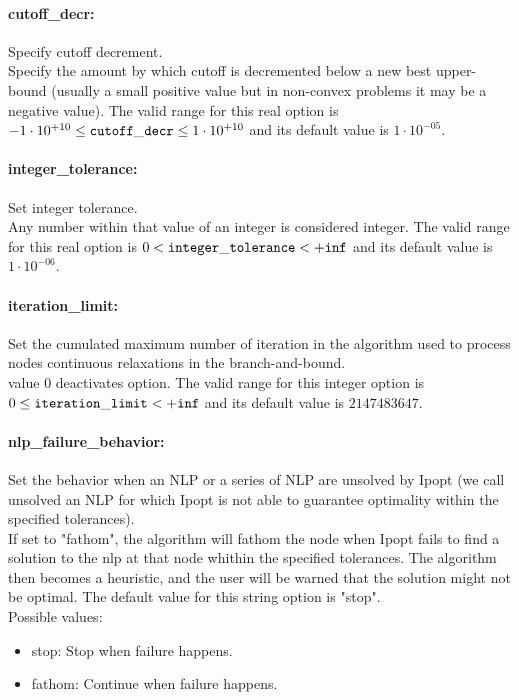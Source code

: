 \paragraph{cutoff\_decr:}\label{sec:cutoff_decr} Specify cutoff decrement. $\;$ \\
 Specify the amount by which cutoff is decremented
below a new best upper-bound (usually a small
positive value but in non-convex problems it may
be a negative value). The valid range for this real option is 
$-1 \cdot 10^{+10} \le {\tt cutoff\_decr } \le 1 \cdot 10^{+10}$
and its default value is $1 \cdot 10^{-05}$.


\paragraph{integer\_tolerance:}\label{sec:integer_tolerance} Set integer tolerance. $\;$ \\
 Any number within that value of an integer is
considered integer. The valid range for this real option is 
$0 <  {\tt integer\_tolerance } <  {\tt +inf}$
and its default value is $1 \cdot 10^{-06}$.


\paragraph{iteration\_limit:}\label{sec:iteration_limit} Set the cumulated maximum number of iteration in the algorithm used to process nodes continuous relaxations in the branch-and-bound. $\;$ \\
 value 0 deactivates option. The valid range for this integer option is
$0 \le {\tt iteration\_limit } <  {\tt +inf}$
and its default value is $2147483647$.


\paragraph{nlp\_failure\_behavior:}\label{sec:nlp_failure_behavior} Set the behavior when an NLP or a series of NLP are unsolved by Ipopt (we call unsolved an NLP for which Ipopt is not able to guarantee optimality within the specified tolerances). $\;$ \\
 If set to "fathom", the algorithm will fathom the
node when Ipopt fails to find a solution to the
nlp at that node whithin the specified
tolerances. The algorithm then becomes a
heuristic, and the user will be warned that the
solution might not be optimal.
The default value for this string option is "stop".
\\ 
Possible values:
\begin{itemize}
   \item stop: Stop when failure happens.
   \item fathom: Continue when failure happens.
\end{itemize}

